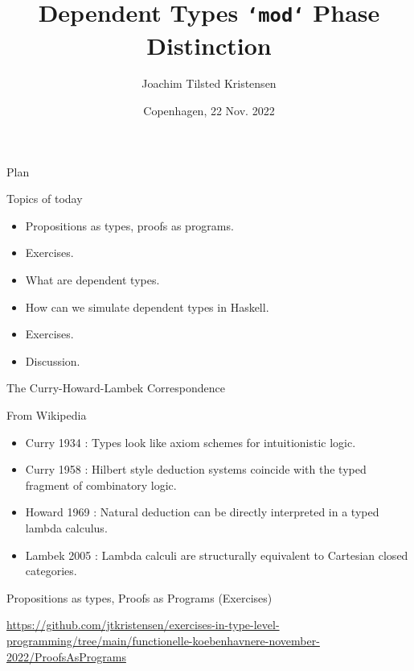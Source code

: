 \documentclass[dvipsnames]{beamer}
\title{Dependent Types \texttt{`mod`} Phase Distinction}
\author{
  Joachim Tilsted Kristensen
}
\institute{
  Univertity of Oslo
}
\date{Copenhagen, 22 Nov. 2022}
\begin{document}
\frame{\titlepage \vspace{-0.5cm}}

\begin{frame}{Plan}
  \begin{block}{Topics of today}
    \begin{itemize}
    \item Propositions as types, proofs as programs.
    \item Exercises.
    \item What are dependent types.
    \item How can we simulate dependent types in Haskell.
    \item Exercises.
    \item Discussion.
    \end{itemize}
  \end{block}
\end{frame}

\begin{frame}{The Curry-Howard-Lambek Correspondence}
  \begin{block}{From Wikipedia}
    \begin{itemize}
    \item Curry 1934 : Types look like axiom schemes for intuitionistic logic.
    \item Curry 1958 : Hilbert style deduction systems coincide with the typed fragment of combinatory logic.
    \item Howard 1969 : Natural deduction can be directly interpreted in a typed lambda calculus.
    \item Lambek 2005 : Lambda calculi are structurally equivalent to Cartesian closed categories.
    \end{itemize}
  \end{block}
\end{frame}

\begin{frame}{Propositions as types, Proofs as Programs (Exercises)}
  \begin{center}
    \url{https://github.com/jtkristensen/exercises-in-type-level-programming/tree/main/functionelle-koebenhavnere-november-2022/ProofsAsPrograms}
  \end{center}
\end{frame}

\end{document}
